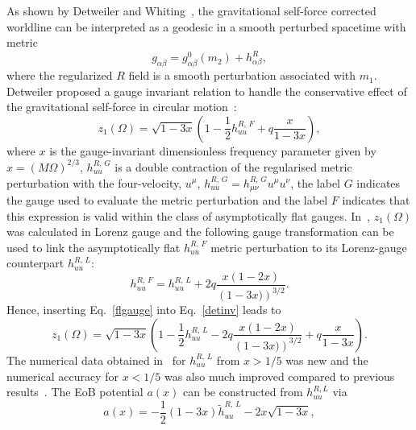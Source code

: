 As shown by Detweiler and Whiting~\cite{Detweiler:2003}, the gravitational self-force corrected worldline can be interpreted as a  geodesic in a smooth perturbed spacetime with metric
 \begin{equation}
 g_{\alpha \beta} =  g^{0}_{\alpha \beta}(m_2) + h^{R}_{\alpha \beta},
 \label{detint}
 \end{equation}
 \noindent where the regularized \(R\) field is a smooth perturbation associated with \(m_1\). Detweiler proposed a gauge invariant relation to handle the conservative effect of the gravitational self-force in circular motion~\cite{Detweiler:2008,Detweiler:2009}:
 \begin{equation}
z_1(\Omega)= \sqrt{1-3x}\left(1- \frac{1}{2} h^{R,\,F}_{uu} + q \frac{x}{1-3x}\right),
\label{detinv}
\end{equation}
\noindent where  \(x\) is the gauge-invariant dimensionless frequency parameter given by \(x=\left(M \Omega\right)^{2/3}\), \(h^{R,\,G}_{uu}\) is a double contraction of the regularised metric perturbation with the four-velocity, \(u^{\mu}\), \( h^{R,\, G}_{uu} = h^{R,\,G}_{\mu\nu}u^{\mu} u^{\nu} \), the label \(G\) indicates the gauge used to evaluate the metric perturbation and the label \(F\) indicates that this expression is valid within the class of asymptotically flat gauges. In~\cite{Akcay:2012}, \(z_1(\Omega)\) was calculated in Lorenz gauge and the following gauge transformation can be used to link the asymptotically flat \(h^{R,\,F}_{uu} \) metric perturbation to its Lorenz-gauge counterpart \(h^{R,\,L}_{uu} \):
\begin{equation}
h^{R,\,F}_{uu} = h^{R,\,L}_{uu} + 2q\frac{x(1-2x)}{\left(1-3x)\right)^{3/2}}.
\label{flgauge}
\end{equation}
\noindent  Hence, inserting Eq.~\eqref{flgauge} into Eq.~\eqref{detinv} leads to
 \begin{equation}
z_1(\Omega)= \sqrt{1-3x}\left(1- \frac{1}{2} h^{R,\,L}_{uu}  - 2q\frac{x(1-2x)}{\left(1-3x)\right)^{3/2}} + q \frac{x}{1-3x}\right).
\label{detinvLOR}
\end{equation}
\noindent The numerical data obtained in~\cite{Akcay:2012} for \(h^{R,\,L}_{uu} \) from \(x>1/5\) was new and the numerical accuracy for \(x<1/5\) was also much improved compared to previous results~\cite{Detweiler:2008,baracknewphi}. The EoB potential \(a(x)\) can be constructed from $h_{uu}^{R,L}$ via
\begin{equation}
 a(x) = -\frac{1}{2}\left(1-3x\right)\tilde{h}^{R,\,L}_{uu} - 2x \sqrt{1-3x},
 \label{formal_a}
 \end{equation}
